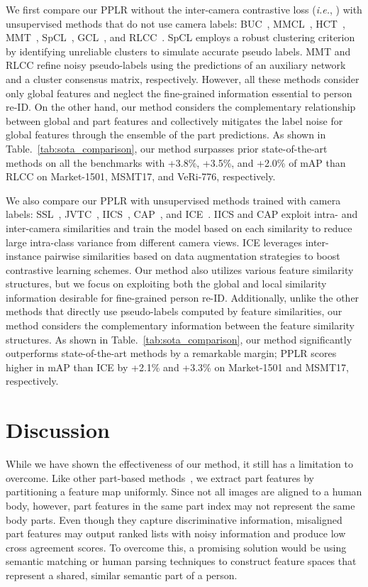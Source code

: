 \documentclass[10pt,twocolumn,letterpaper]{article}
\begin{document}
    We first compare our PPLR without the inter-camera contrastive loss (\textit{i.e.}, ) with unsupervised methods that do not use camera labels: BUC~\cite{lin2019aBottom}, MMCL~\cite{wang2020unsupervised}, HCT~\cite{zeng2020hierarchical}, MMT~\cite{ge2020mutual}, SpCL~\cite{ge2020selfpaced}, GCL~\cite{chen2021joint}, and RLCC~\cite{zhang2021refining}.
    SpCL employs a robust clustering criterion by identifying unreliable clusters to simulate accurate pseudo labels.
    MMT and RLCC refine noisy pseudo-labels using the predictions of an auxiliary network and a cluster consensus matrix, respectively.
    However, all these methods consider only global features and neglect the fine-grained information essential to person re-ID.
    On the other hand, our method considers the complementary relationship between global and part features and collectively mitigates the label noise for global features through the ensemble of the part predictions.
    As shown in Table.~\ref{tab:sota_comparison}, our method surpasses prior state-of-the-art methods on all the benchmarks with +3.8\%, +3.5\%, and +2.0\% of mAP than RLCC on Market-1501, MSMT17, and VeRi-776, respectively.

    We also compare our PPLR with unsupervised methods trained with camera labels: SSL~\cite{lin2020unsupervised}, JVTC~\cite{li2020joint}, IICS~\cite{xuan2021intra}, CAP~\cite{wang2021camera}, and ICE~\cite{chen2021ice}.
    IICS and CAP exploit intra- and inter-camera similarities and train the model based on each similarity to reduce large intra-class variance from different camera views.
    ICE leverages inter-instance pairwise similarities based on data augmentation strategies to boost contrastive learning schemes.
    Our method also utilizes various feature similarity structures, but we focus on exploiting both the global and local similarity information desirable for fine-grained person re-ID.
    Additionally, unlike the other methods that directly use pseudo-labels computed by feature similarities, our method considers the complementary information between the feature similarity structures.
    As shown in Table.~\ref{tab:sota_comparison}, our method significantly outperforms state-of-the-art methods by a remarkable margin;
    PPLR scores higher in mAP than ICE by +2.1\% and +3.3\% on Market-1501 and MSMT17, respectively.
 \section{Discussion}
    While we have shown the effectiveness of our method, it still has a limitation to overcome.
    Like other part-based methods~\cite{sun2018beyond, zheng2019pyramidal, fu2019self}, we extract part features by partitioning a feature map uniformly.
    Since not all images are aligned to a human body, however, part features in the same part index may not represent the same body parts. 
    Even though they capture discriminative information, misaligned part features may output ranked lists with noisy information and produce low cross agreement scores. 
    To overcome this, a promising solution would be using semantic matching or human parsing techniques to construct feature spaces that represent a shared, similar semantic part of a person.
    
\end{document}

